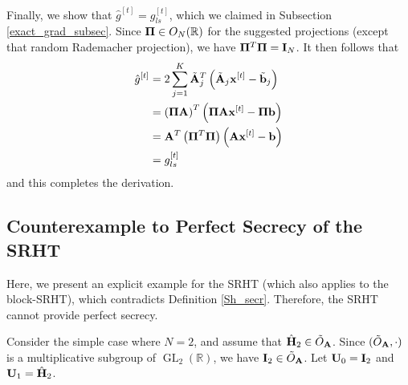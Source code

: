\documentclass[journal,letterpaper,onecolumn,twoside,nofonttune]{IEEEtran}
\newcommand{\Otil}{\tilde{O}}
\newcommand{\Ub}{\bold{U}}
\newcommand{\xb}{\bold{x}}
\newcommand{\Pibold}{\bold{\Pi}}
\newcommand{\R}{\mathbb{R}}
\newcommand{\gh}{\hat{g}}
\newcommand{\Ab}{\bold{A}}
\newcommand{\Abt}{{\tilde{\bold{A}}}}
\newcommand{\bb}{\bold{b}}
\newcommand{\bbt}{\tilde{\bold{b}}}
\newcommand{\Ib}{\bold{I}}
\newcommand{\Hbh}{\hat{\bold{H}}}
\DeclareMathOperator{\GL}{GL}
\begin{document}
Finally, we show that $\gh^{[t]}=g_{ls}^{[t]}$, which we claimed in Subsection \ref{exact_grad_subsec}. Since $\Pibold\in O_N(\R)$ for the suggested projections (except that random Rademacher projection), we have $\Pibold^T\Pibold=\Ib_N$. It then follows that
\begin{align}
  \gh^{[t]} &= 2\sum\limits_{j=1}^K\Abt_j^T\left(\Abt_j\xb^{[t]}-\bbt_j\right) \notag \\
  &= \left(\Pibold\Ab\right)^T\left(\Pibold\Ab\xb^{[t]}-\Pibold\bb\right) \notag \\
  &= \Ab^T\left(\Pibold^T\Pibold\right)\left(\Ab\xb^{[t]}-\bb\right) \notag \\
  &= g_{ls}^{[t]} \label{eq_orth_encr}  %
\end{align}
and this completes the derivation.

\subsection{Counterexample to Perfect Secrecy of the SRHT}
\label{SRHT_counter_example}

Here, we present an explicit example for the SRHT (which also applies to the block-SRHT), which contradicts Definition \ref{Sh_secr}. Therefore, the SRHT cannot provide perfect secrecy.

Consider the simple case where $N=2$, and assume that $\Hbh_2\in\Otil_\Ab$. Since $(\Otil_\Ab,\cdot)$ is a multiplicative subgroup of $\GL_2(\R)$, we have $\Ib_2\in\Otil_\Ab$. Let $\Ub_0=\Ib_2$ and $\Ub_1=\Hbh_2$.
\end{document}
